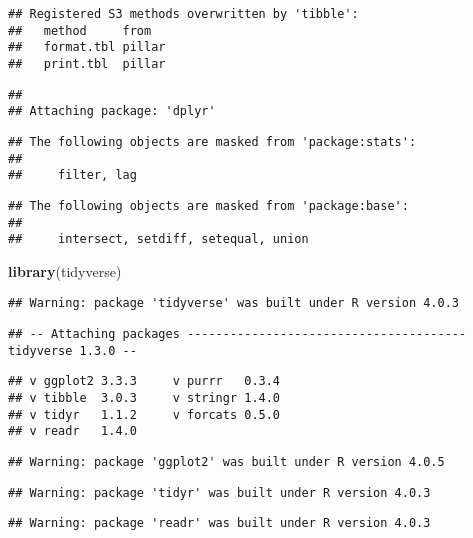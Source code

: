 \documentclass[
]{article}
\newenvironment{Shaded}{\begin{snugshade}}{\end{snugshade}}
\newcommand{\KeywordTok}[1]{\textcolor[rgb]{0.13,0.29,0.53}{\textbf{#1}}}
\newcommand{\NormalTok}[1]{#1}
\begin{document}
\begin{verbatim}
## Registered S3 methods overwritten by 'tibble':
##   method     from  
##   format.tbl pillar
##   print.tbl  pillar
\end{verbatim}

\begin{verbatim}
## 
## Attaching package: 'dplyr'
\end{verbatim}

\begin{verbatim}
## The following objects are masked from 'package:stats':
## 
##     filter, lag
\end{verbatim}

\begin{verbatim}
## The following objects are masked from 'package:base':
## 
##     intersect, setdiff, setequal, union
\end{verbatim}

\begin{Shaded}
\begin{Highlighting}[]
\KeywordTok{library}\NormalTok{(tidyverse)}
\end{Highlighting}
\end{Shaded}

\begin{verbatim}
## Warning: package 'tidyverse' was built under R version 4.0.3
\end{verbatim}

\begin{verbatim}
## -- Attaching packages --------------------------------------- tidyverse 1.3.0 --
\end{verbatim}

\begin{verbatim}
## v ggplot2 3.3.3     v purrr   0.3.4
## v tibble  3.0.3     v stringr 1.4.0
## v tidyr   1.1.2     v forcats 0.5.0
## v readr   1.4.0
\end{verbatim}

\begin{verbatim}
## Warning: package 'ggplot2' was built under R version 4.0.5
\end{verbatim}

\begin{verbatim}
## Warning: package 'tidyr' was built under R version 4.0.3
\end{verbatim}

\begin{verbatim}
## Warning: package 'readr' was built under R version 4.0.3
\end{verbatim}
\end{document}

